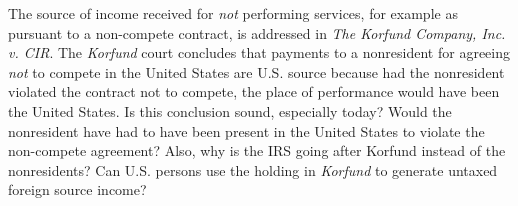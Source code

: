 %
%
%

The source of income received for \emph{not} performing services, for example as pursuant to a non-compete contract, is addressed in \emph{The Korfund Company, Inc. v. CIR}.  The \emph{Korfund} court concludes that payments to a nonresident for agreeing \emph{not} to compete in the United States are U.S. source because had the nonresident violated the contract not to compete, the place of performance would have been the United States.  Is this conclusion sound, especially today?  Would the nonresident have had to have been present in the United States to violate the non-compete agreement?  Also, why is the IRS going after Korfund instead of the nonresidents?  Can U.S. persons use the holding in \emph{Korfund} to generate untaxed foreign source income?

